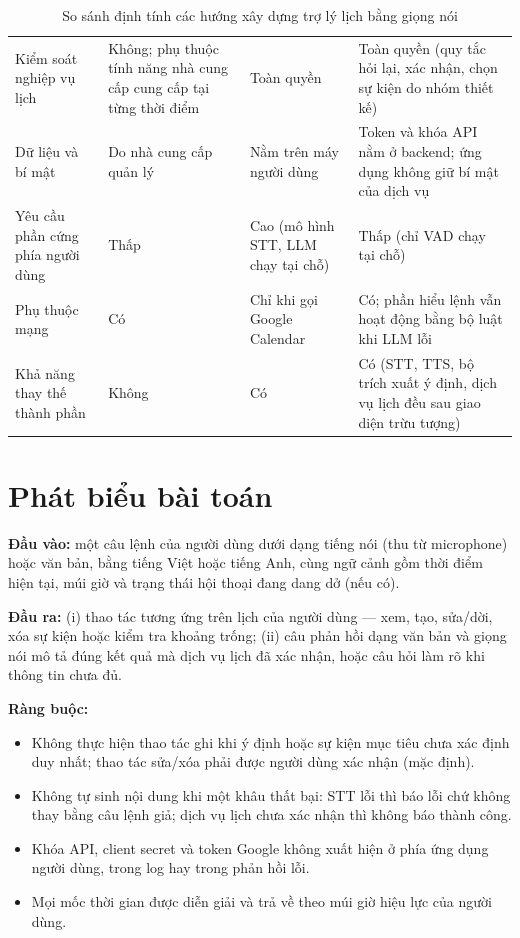 \begin{table}[!htbp]
\caption{So sánh định tính các hướng xây dựng trợ lý lịch bằng giọng nói}\label{tab:approaches}
\bang
\begin{tabularx}{\textwidth}{|L{2.6cm}|Y|Y|Y|}\hline
{} &  &  & \\\hline
Kiểm soát nghiệp vụ lịch & Không; phụ thuộc tính năng nhà cung cấp cung cấp tại từng thời điểm & Toàn quyền & Toàn quyền (quy tắc hỏi lại, xác nhận, chọn sự kiện do nhóm thiết kế)\\\hline
Dữ liệu và bí mật & Do nhà cung cấp quản lý & Nằm trên máy người dùng & Token và khóa API nằm ở backend; ứng dụng không giữ bí mật của dịch vụ\\\hline
Yêu cầu phần cứng phía người dùng & Thấp & Cao (mô hình STT, LLM chạy tại chỗ) & Thấp (chỉ VAD chạy tại chỗ)\\\hline
Phụ thuộc mạng & Có & Chỉ khi gọi Google Calendar & Có; phần hiểu lệnh vẫn hoạt động bằng bộ luật khi LLM lỗi\\\hline
Khả năng thay thế thành phần & Không & Có & Có (STT, TTS, bộ trích xuất ý định, dịch vụ lịch đều sau giao diện trừu tượng)\\\hline
\end{tabularx}
\end{table}

\section{Phát biểu bài toán}
\textbf{Đầu vào:} một câu lệnh của người dùng dưới dạng tiếng nói (thu từ microphone) hoặc văn bản, bằng tiếng Việt hoặc tiếng Anh, cùng ngữ cảnh gồm thời điểm hiện tại, múi giờ và trạng thái hội thoại đang dang dở (nếu có).

\textbf{Đầu ra:} (i) thao tác tương ứng trên lịch của người dùng — xem, tạo, sửa/dời, xóa sự kiện hoặc kiểm tra khoảng trống; (ii) câu phản hồi dạng văn bản và giọng nói mô tả đúng kết quả mà dịch vụ lịch đã xác nhận, hoặc câu hỏi làm rõ khi thông tin chưa đủ.

\textbf{Ràng buộc:}
\begin{itemize}
  \item Không thực hiện thao tác ghi khi ý định hoặc sự kiện mục tiêu chưa xác định duy nhất; thao tác sửa/xóa phải được người dùng xác nhận (mặc định).
  \item Không tự sinh nội dung khi một khâu thất bại: STT lỗi thì báo lỗi chứ không thay bằng câu lệnh giả; dịch vụ lịch chưa xác nhận thì không báo thành công.
  \item Khóa API, client secret và token Google không xuất hiện ở phía ứng dụng người dùng, trong log hay trong phản hồi lỗi.
  \item Mọi mốc thời gian được diễn giải và trả về theo múi giờ hiệu lực của người dùng.
\end{itemize}

